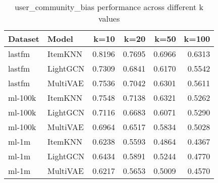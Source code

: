 \begin{table}[htbp]
\centering
\caption{user_community_bias performance across different k values}
\begin{tabular}{llrrrr}
\toprule
Dataset & Model & k=10 & k=20 & k=50 & k=100 \\
\midrule
lastfm & ItemKNN & 0.8196 & 0.7695 & 0.6966 & 0.6313 \\
lastfm & LightGCN & 0.7309 & 0.6841 & 0.6170 & 0.5542 \\
lastfm & MultiVAE & 0.7536 & 0.7042 & 0.6301 & 0.5611 \\
ml-100k & ItemKNN & 0.7548 & 0.7138 & 0.6321 & 0.5262 \\
ml-100k & LightGCN & 0.7116 & 0.6683 & 0.6071 & 0.5290 \\
ml-100k & MultiVAE & 0.6964 & 0.6517 & 0.5834 & 0.5028 \\
ml-1m & ItemKNN & 0.6238 & 0.5593 & 0.4864 & 0.4367 \\
ml-1m & LightGCN & 0.6434 & 0.5891 & 0.5244 & 0.4770 \\
ml-1m & MultiVAE & 0.6217 & 0.5653 & 0.5009 & 0.4570 \\
\bottomrule
\end{tabular}
\end{table}